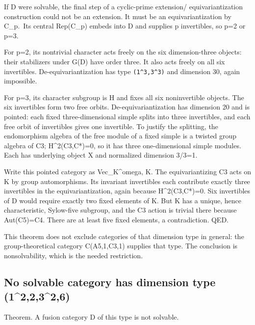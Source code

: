 If D were solvable, the final step of a cyclic-prime extension/
equivariantization construction could not be an extension. It must be an
equivariantization by C\_p.~Its central Rep(C\_p) embeds into D and
supplies p invertibles, so p=2 or p=3.

For p=2, its nontrivial character acts freely on the six dimension-three
objects: their stabilizers under G(D) have order three. It also acts
freely on all six invertibles. De-equivariantization has type
\texttt{(1\textasciicircum{}3,3\allowbreak{}\textasciicircum{}3)} and
dimension 30, again impossible.

For p=3, its character subgroup is H and fixes all six noninvertible
objects. The six invertibles form two free orbits. De-equivariantization
has dimension 20 and is pointed: each fixed three-dimensional simple
splits into three invertibles, and each free orbit of invertibles gives
one invertible. To justify the splitting, the endomorphism algebra of
the free module of a fixed simple is a twisted group algebra of C3;
H\^{}2(C3,C*)=0, so it has three one-dimensional simple modules. Each
has underlying object X and normalized dimension 3/3=1.

Write this pointed category as Vec\_K\^{}omega, \textbar K.
The equivariantizing C3 acts on K by group automorphisms. Its invariant
invertibles each contribute exactly three invertibles in the
equivariantization, again because H\^{}2(C3,C*)=0. Six invertibles of D
would require exactly two fixed elements of K. But K has a unique, hence
characteristic, Sylow-five subgroup, and the C3 action is trivial there
because Aut(C5)=C4. There are at least five fixed elements, a
contradiction. QED.

This theorem does not exclude categories of that dimension type in
general: the group-theoretical category C(A5,1,C3,1) supplies that type.
The conclusion is nonsolvability, which is the needed restriction.

\hypertarget{no-solvable-category-has-dimension-type-122326}{%
\subsection{No solvable category has dimension type
(1\^{}2,2,3\^{}2,6)}\label{no-solvable-category-has-dimension-type-122326}}

Theorem. A fusion category D of this type is not solvable.

